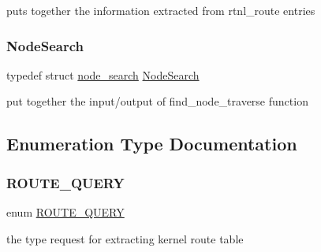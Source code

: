 puts together the information extracted from rtnl\+\_\+route entries 

\mbox{\label{route-tree_8c_a26d9b840f9226a0ce349b00950ea0bdc}} 
\subsubsection{\texorpdfstring{Node\+Search}{NodeSearch}}
{\footnotesize\ttfamily typedef struct \hyperlink{structnode__search}{node\+\_\+search}  \hyperlink{route-tree_8c_a26d9b840f9226a0ce349b00950ea0bdc}{Node\+Search}}



put together the input/output of find\+\_\+node\+\_\+traverse function 



\subsection{Enumeration Type Documentation}
\mbox{\label{route-tree_8c_aed8cdbb52dbe32c343a8c26887888e7f}} 
\subsubsection{\texorpdfstring{R\+O\+U\+T\+E\+\_\+\+Q\+U\+E\+RY}{ROUTE\_QUERY}}
{\footnotesize\ttfamily enum \hyperlink{route-tree_8c_aed8cdbb52dbe32c343a8c26887888e7f}{R\+O\+U\+T\+E\+\_\+\+Q\+U\+E\+RY}}



the type request for extracting kernel route table 

